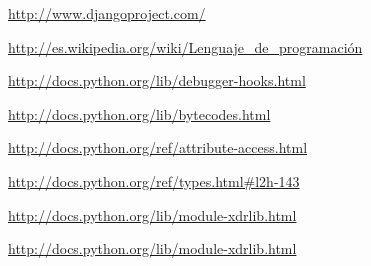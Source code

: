 \documentclass[12pt,legalpaper]{report}
\begin{document}
\begin{thebibliography}{30}

\href{http://www.djangoproject.com/}{http://www.djangoproject.com/}


\href{http://es.wikipedia.org/wiki/Lenguaje_de_programación}{http://es.wikipedia.org/wiki/Lenguaje\_de\_programación}


\href{http://docs.python.org/lib/debugger-hooks.html}{http://docs.python.org/lib/debugger-hooks.html}


\href{http://docs.python.org/lib/bytecodes.html}{http://docs.python.org/lib/bytecodes.html}


\href{http://docs.python.org/ref/attribute-access.html}{http://docs.python.org/ref/attribute-access.html}


\href{http://docs.python.org/ref/types.html\#l2h-143}{http://docs.python.org/ref/types.html\#l2h-143}


\href{http://docs.python.org/lib/module-xdrlib.html}{http://docs.python.org/lib/module-xdrlib.html}


\href{http://docs.python.org/lib/module-xdrlib.html}{http://docs.python.org/lib/module-xdrlib.html}


\end{thebibliography}
\end{document}

